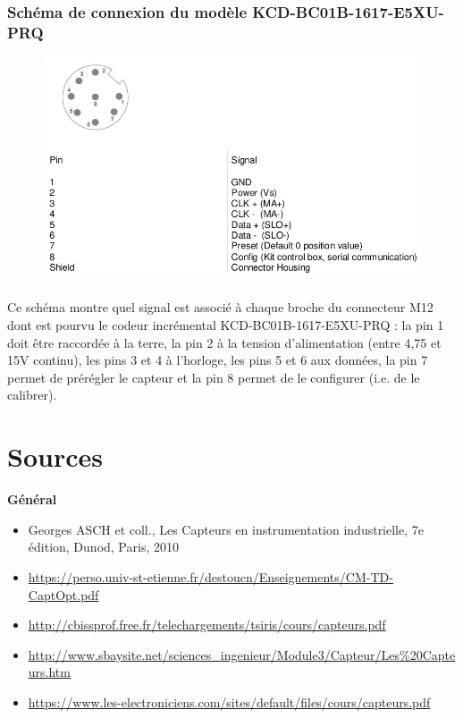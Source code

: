 \documentclass{article}
\begin{document}
    \subsubsection{Schéma de connexion du modèle KCD-BC01B-1617-E5XU-PRQ}
    \begin{figure}[H]
        \centering
        \includegraphics[width=0.7\linewidth]{./images/hall-schema.png}
    \end{figure}
    \paragraph{}
    Ce schéma montre quel signal est associé à chaque broche du connecteur M12 dont est pourvu le codeur incrémental KCD-BC01B-1617-E5XU-PRQ : la pin 1 doit être raccordée à la terre, la pin 2 à la tension d'alimentation (entre 4,75 et 15V continu), les pins 3 et 4 à l'horloge, les pins 5 et 6 aux données, la pin 7 permet de prérégler le capteur et la pin 8 permet de le configurer (i.e. de le calibrer).


    \newpage
    \section*{Sources}

    \textbf{Général}
    \begin{itemize}
        \item Georges ASCH et coll., Les Capteurs en instrumentation industrielle, 7e édition, Dunod, Paris, 2010
        \item \url{https://perso.univ-st-etienne.fr/destoucn/Enseignements/CM-TD-CaptOpt.pdf}
        \item \url{http://cbissprof.free.fr/telechargements/tsiris/cours/capteurs.pdf}
        \item \url{http://www.sbaysite.net/sciences_ingenieur/Module3/Capteur/Les%20Capteurs.htm}
        \item \url{https://www.les-electroniciens.com/sites/default/files/cours/capteurs.pdf}
    \end{itemize}
    \bigskip
\end{document}
